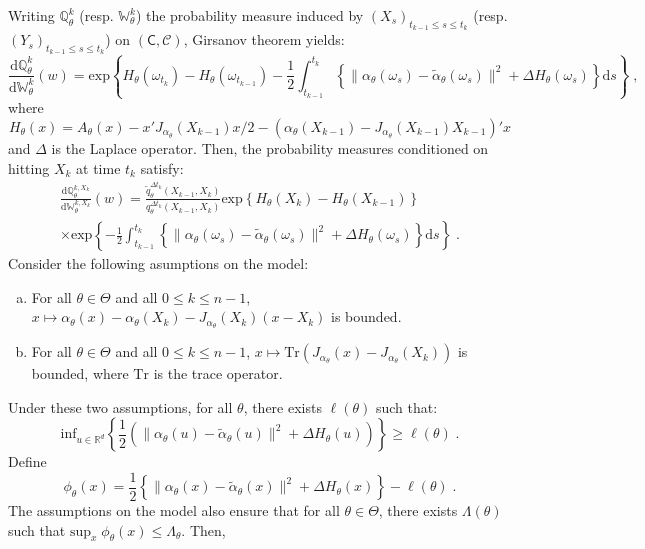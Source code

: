 \documentclass[12pt]{article}
\newcommand{\rmd}{\mathrm{d}}
\newcommand{\eqsp}{\;}
\newcommand{\1}{\mathrm{1}}
\begin{document}
Writing $\mathbb{Q}^k_{\theta}$ (resp. $\mathbb{W}^{k}_{\theta}$) the probability measure induced by $(X_s)_{t_{k-1}\le s\le t_k}$  (resp. $(Y_s)_{t_{k-1}\le s\le t_k}$) on $(\mathsf{C},\mathcal{C})$, Girsanov theorem yields:
\[
\frac{\rmd \mathbb{Q}^k_{\theta}}{\rmd \mathbb{W}^{k}_{\theta}}(w) = \mathrm{exp}\left\{H_{\theta}(\omega_{t_k}) - H_{\theta}(\omega_{t_{k-1}}) - \frac{1}{2}\int_{t_{k-1}}^{t_k}\left\{\|\alpha_{\theta}(\omega_s)-\widetilde{\alpha}_{\theta}(\omega_s)\|^2+\Delta H_{\theta}(\omega_s)\right\}\rmd s\right\}\eqsp,
\]
where 
\[
H_{\theta}(x) = A_{\theta}(x) - x'J_{\alpha_{\theta}}(X_{k-1})x/2- (\alpha_{\theta}(X_{k-1}) - J_{\alpha_{\theta}}(X_{k-1})X_{k-1})'x
\]
and $\Delta$ is the Laplace operator. Then, the probability measures conditioned on hitting $X_{k}$ at time $t_k$ satisfy:
\begin{multline}
\label{eq:Girsanov}
\frac{\rmd \mathbb{Q}^{k,X_{k}}_{\theta}}{\rmd \mathbb{W}^{k,X_{k}}_{\theta}}(w) = \frac{\widetilde{q}^{\Delta t_k}_{\theta}(X_{k-1},X_{k})}{q^{\Delta t_k}_{\theta}(X_{k-1},X_{k})}\mathrm{exp}\left\{H_{\theta}(X_k) - H_{\theta}(X_{k-1})\right\} \\
\times \mathrm{exp}\left\{- \frac{1}{2}\int_{t_{k-1}}^{t_k}\left\{\|\alpha_{\theta}(\omega_s)-\widetilde{\alpha}_{\theta}(\omega_s)\|^2+\Delta H_{\theta}(\omega_s)\right\}\rmd s\right\}\eqsp.
\end{multline}
Consider the following asumptions on the model:
\begin{enumerate}[(a)]
\item For all $\theta\in\Theta$ and all $0\le k \le n-1$, $x\mapsto \alpha_{\theta}(x) - \alpha_{\theta}(X_k) - J_{\alpha_{\theta}}(X_{k})(x-X_k)$ is bounded.
\item For all $\theta\in\Theta$ and all $0\le k \le n-1$, $x\mapsto \mathrm{Tr}\left(J_{\alpha_{\theta}}(x) - J_{\alpha_{\theta}}(X_k)\right)$ is bounded, where $\mathrm{Tr}$ is the trace operator.
\end{enumerate}
Under these two assumptions, for all $\theta$, there exists $\ell(\theta)$ such that:
\[
\mathrm{inf}_{u\in \mathbb{R}^d} \left\{\frac{1}{2}\left(\|\alpha_{\theta}(u)-\widetilde{\alpha}_{\theta}(u)\|^2+\Delta H_{\theta}(u)\right)\right\}\ge \ell(\theta)\eqsp.
\]
Define
\[
\phi_{\theta}(x) = \frac{1}{2}\left\{\|\alpha_{\theta}(x)-\widetilde{\alpha}_{\theta}(x)\|^2+\Delta H_{\theta}(x)\right\}-\ell(\theta)\eqsp.
\]
The assumptions on the model also ensure that for all $\theta\in\Theta$, there exists $\Lambda(\theta)$ such that  $\mathrm{sup}_x\eqsp \phi_{\theta}(x)\le \Lambda_{\theta}$. Then,
\end{document}
